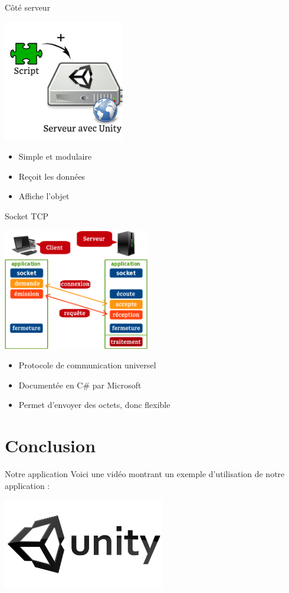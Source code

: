 \documentclass[a4paper,10pt]{beamer}
\begin{document}
	

	\begin{frame}{Côté serveur}
		\centerline{\includegraphics[height=150pt]{images/network/plugin.png}}
		\begin{itemize}	
			\item \pause Simple et modulaire \pause
			\item Reçoit les données \pause
			\item Affiche l'objet 
		\end{itemize}	
		
	\end{frame}
	
	
	\begin{frame}{Socket TCP}
		\centerline{\includegraphics[height=150pt]{images/network/tcp-socket6.png}}
			\begin{itemize}
				\item \pause Protocole de communication universel \pause
				\item Documentée en C\# par Microsoft \pause
				\item Permet d'envoyer des octets, donc flexible
			\end{itemize}
	\end{frame}
	
	\section{Conclusion}
	
	\begin{frame}{Notre application}
		Voici une vidéo montrant un exemple d'utilisation de notre application :
		
		\href{run:PresentationAppli.wmv}{\includegraphics[width=200pt]{images/techno/unity-logo.png}}
	\end{frame}
	
\end{document}
